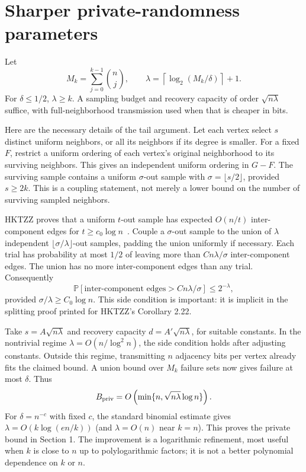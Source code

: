 \documentclass[11pt]{article}
\theoremstyle{remark}\newtheorem{remark}[theorem]{Remark}
\newcommand{\Prb}{\mathbb P}
\begin{document}
\section{Sharper private-randomness parameters}\label{sec:private}
Let
\[
 M_k=\sum_{j=0}^{k-1}\binom nj,\qquad
 \lambda=\left\lceil\log_2(M_k/\delta)\right\rceil+1.
\]
For $\delta\le1/2$, $\lambda\ge k$. A sampling budget and recovery capacity of order $\sqrt{n\lambda}$ suffice, with full-neighborhood transmission used when that is cheaper in bits.

Here are the necessary details of the tail argument. Let each vertex select $s$ distinct uniform neighbors, or all its neighbors if its degree is smaller. For a fixed $F$, restrict a uniform ordering of each vertex's original neighborhood to its surviving neighbors. This gives an independent uniform ordering in $G-F$. The surviving sample contains a uniform $\sigma$-out sample with $\sigma=\lfloor s/2\rfloor$, provided $s\ge2k$. This is a coupling statement, not merely a lower bound on the number of surviving sampled neighbors.

HKTZZ proves that a uniform $t$-out sample has expected $O(n/t)$ inter-component edges for $t\ge c_0\log n$~\cite{HKTZZ19}. Couple a $\sigma$-out sample to the union of $\lambda$ independent $\lfloor\sigma/\lambda\rfloor$-out samples, padding the union uniformly if necessary. Each trial has probability at most $1/2$ of leaving more than $C n\lambda/\sigma$ inter-component edges. The union has no more inter-component edges than any trial. Consequently
\[
 \Prb\left[\text{inter-component edges}>C n\lambda/\sigma\right]\le2^{-\lambda},
\]
provided $\sigma/\lambda\ge C_0\log n$. This side condition is important: it is implicit in the splitting proof printed for HKTZZ's Corollary 2.22.

Take $s=A\sqrt{n\lambda}$ and recovery capacity $d=A'\sqrt{n\lambda}$, for suitable constants. In the nontrivial regime $\lambda=O(n/\log^2n)$, the side condition holds after adjusting constants. Outside this regime, transmitting $n$ adjacency bits per vertex already fits the claimed bound. A union bound over $M_k$ failure sets now gives failure at most $\delta$. Thus
\[
 B_{\rm priv}=O\left(\min\{n,\sqrt{n\lambda}\log n\}\right).
\]
For $\delta=n^{-c}$ with fixed $c$, the standard binomial estimate gives $\lambda=O(k\log(en/k))$ (and $\lambda=O(n)$ near $k=n$). This proves the private bound in Section 1. The improvement is a logarithmic refinement, most useful when $k$ is close to $n$ up to polylogarithmic factors; it is not a better polynomial dependence on $k$ or $n$.
\end{document}
